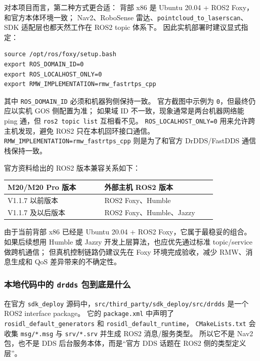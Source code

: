 \documentclass[UTF8,11pt,a4paper]{ctexart}
\begin{document}
对本项目而言，第二种方式更合适：
背部 x86 是 Ubuntu 20.04 + ROS2 Foxy，和官方本体环境一致；
Nav2、RoboSense 雷达、\texttt{pointcloud\_to\_laserscan}、SDK 适配层也都天然工作在 ROS2 topic 体系下。
因此实机部署时建议显式指定：

\begin{verbatim}
source /opt/ros/foxy/setup.bash
export ROS_DOMAIN_ID=0
export ROS_LOCALHOST_ONLY=0
export RMW_IMPLEMENTATION=rmw_fastrtps_cpp
\end{verbatim}

其中 \texttt{ROS\_DOMAIN\_ID} 必须和机器狗侧保持一致。
官方截图中示例为 \texttt{0}，但最终仍应以实机 GOS 侧配置为准；
如果域 ID 不一致，现象通常是两台机器网络能 ping 通，但 \texttt{ros2 topic list} 互相看不见。
\texttt{ROS\_LOCALHOST\_ONLY=0} 用来允许跨主机发现，避免 ROS2 只在本机回环接口通信。
\texttt{RMW\_IMPLEMENTATION=rmw\_fastrtps\_cpp} 则是为了和官方 DrDDS/FastDDS 通信栈保持一致。

官方资料给出的 ROS2 版本兼容关系如下：

\begin{center}
\renewcommand{\arraystretch}{1.22}
\begin{tabular}{p{0.38\linewidth}p{0.44\linewidth}}
\toprule
\textbf{M20/M20 Pro 版本} & \textbf{外部主机 ROS2 版本}\\
\midrule
V1.1.7 以前版本 & ROS2 Foxy、Humble\\
V1.1.7 及以后版本 & ROS2 Foxy、Humble、Jazzy\\
\bottomrule
\end{tabular}
\end{center}

由于当前背部 x86 已经是 Ubuntu 20.04 + ROS2 Foxy，它属于最稳妥的组合。
如果后续想用 Humble 或 Jazzy 开发上层算法，也应优先通过标准 topic/service 做跨机通信；
但真机控制链路仍建议先在 Foxy 环境完成验收，减少 RMW、消息生成和 QoS 差异带来的不确定性。

\subsubsection{本地代码中的 \texttt{drdds} 包到底是什么}

在官方 \texttt{sdk\_deploy} 源码中，\texttt{src/third\_party/sdk\_deploy/src/drdds} 是一个 ROS2 interface package。
它的 \texttt{package.xml} 中声明了 \texttt{rosidl\_default\_generators} 和 \texttt{rosidl\_default\_runtime}，
\texttt{CMakeLists.txt} 会收集 \texttt{msg/*.msg} 与 \texttt{srv/*.srv} 并生成 ROS2 消息/服务类型。
所以它不是 Nav2 包，也不是 DDS 后台服务本体，而是“官方 DDS 话题在 ROS2 侧的类型定义层”。
\end{document}
